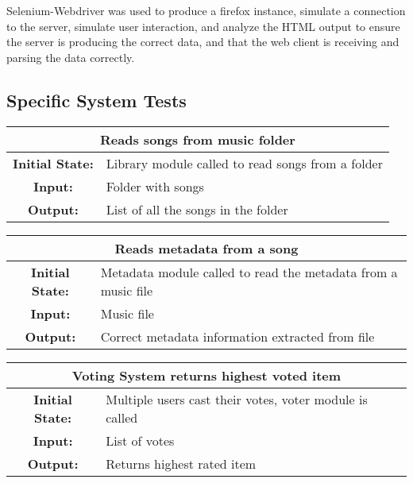 \documentclass[12pt, titlepage]{article}
\begin{document}
Selenium-Webdriver was used to produce a firefox instance, simulate a connection to the server, simulate user interaction, and analyze the HTML output to ensure the server is producing the correct data, and that the web client is receiving and parsing the data correctly.
        
\subsection{Specific System Tests}


\begin{center}
\begin{table}[H]
\begin{tabularx}{\textwidth}{| c X |}
\hline
\multicolumn{2}{|c|}{\textbf{Reads songs from music folder}}\\
\hline
\textbf{Initial State: } & Library module called to read songs from a folder\\
\textbf{Input: } & Folder with songs\\
\textbf{Output: } & List of all the songs in the folder\\
\hline
\end{tabularx}
\end{table}
\end{center}


\begin{center}
\begin{table}[H]
\begin{tabularx}{\textwidth}{| c X |}
\hline
\multicolumn{2}{|c|}{\textbf{Reads metadata from a song}}\\
\hline
\textbf{Initial State: } & Metadata module called to read the metadata from a music file\\
\textbf{Input: } & Music file\\
\textbf{Output: } & Correct metadata information extracted from file\\
\hline
\end{tabularx}
\end{table}
\end{center}


\begin{center}
\begin{table}[H]
\begin{tabularx}{\textwidth}{| c X |}
\hline
\multicolumn{2}{|c|}{\textbf{Voting System returns highest voted item}}\\
\hline
\textbf{Initial State: } & Multiple users cast their votes, voter module is called\\
\textbf{Input: } & List of votes\\
\textbf{Output: } & Returns highest rated item\\
\hline
\end{tabularx}
\end{table}
\end{center}
\end{document}
